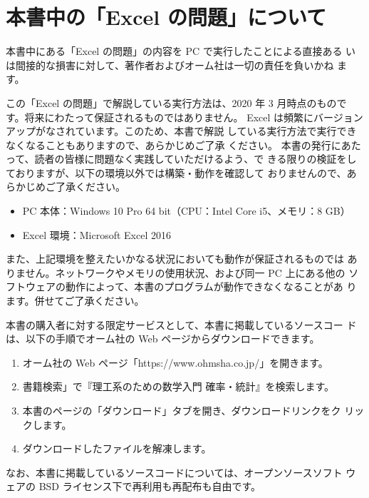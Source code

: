 \section*{本書中の「Excel の問題」について}
\fancyhead{}

本書中にある「Excel の問題」の内容を PC で実行したことによる直接ある いは間接的な損害に対して、著作者およびオーム社は一切の責任を負いかね ます。

この「Excel の問題」で解説している実行方法は、2020 年 3 月時点のもので す。将来にわたって保証されるものではありません。 Excel は頻繁にバージョンアップがなされています。このため、本書で解説 している実行方法で実行できなくなることもありますので、あらかじめご了承 ください。 本書の発行にあたって、読者の皆様に問題なく実践していただけるよう、で きる限りの検証をしておりますが、以下の環境以外では構築・動作を確認して おりませんので、あらかじめご了承ください。

\begin{itemize}
    \item PC 本体：Windows 10 Pro 64 bit（CPU：Intel Core i5、メモリ：8 GB） 
    \item Excel 環境：Microsoft Excel 2016
\end{itemize}

また、上記環境を整えたいかなる状況においても動作が保証されるものでは ありません。ネットワークやメモリの使用状況、および同一 PC 上にある他の ソフトウェアの動作によって、本書のプログラムが動作できなくなることがあ ります。併せてご了承ください。 

本書の購入者に対する限定サービスとして、本書に掲載しているソースコー ドは、以下の手順でオーム社の Web ページからダウンロードできます。 

\begin{enumerate}[label=\protect\circled{\arabic*}]
    \item オーム社の Web ページ「https://www.ohmsha.co.jp/」を開きます。
    \item 書籍検索」で『理工系のための数学入門 確率・統計』を検索します。
    \item 本書のページの「ダウンロード」タブを開き、ダウンロードリンクをク リックします。 
    \item ダウンロードしたファイルを解凍します。
\end{enumerate} 


なお、本書に掲載しているソースコードについては、オープンソースソフト ウェアの BSD ライセンス下で再利用も再配布も自由です。
